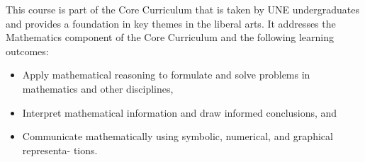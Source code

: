 

This course is part of the Core Curriculum that is taken by UNE undergraduates and provides a foundation in key themes in the liberal arts. It addresses the Mathematics component of the Core Curriculum and the following learning outcomes:
\begin{itemize}
	\item Apply mathematical reasoning to formulate and solve problems in mathematics and other disciplines,
\item Interpret mathematical information and draw informed conclusions, and
\item Communicate mathematically using symbolic, numerical, and graphical representa-
	tions.
\end{itemize} 